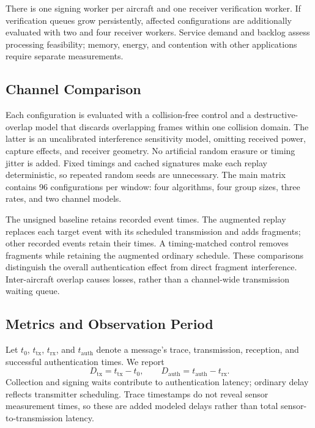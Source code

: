 There is one signing worker per aircraft and one receiver verification
worker. If verification queues grow persistently, affected configurations
are additionally evaluated with two and four receiver workers. Service
demand and backlog assess processing feasibility; memory, energy, and
contention with other applications require separate measurements.

\subsection{Channel Comparison}
\label{subsec:experimental-variables}

Each configuration is evaluated with a collision-free control and a
destructive-overlap model that discards overlapping frames within one
collision domain. The latter is an uncalibrated interference sensitivity
model, omitting received power, capture effects, and receiver geometry.
No artificial random erasure or timing jitter is added. Fixed timings and
cached signatures make each replay deterministic, so repeated random seeds
are unnecessary. The main matrix contains 96 configurations per window:
four algorithms, four group sizes, three rates, and two channel models.

The unsigned baseline retains recorded event times. The augmented replay
replaces each target event with its scheduled transmission and adds
fragments; other recorded events retain their times. A timing-matched
control removes fragments while retaining the augmented ordinary schedule.
These comparisons distinguish the overall authentication effect from
direct fragment interference. Inter-aircraft overlap causes losses, rather
than a channel-wide transmission waiting queue.

\subsection{Metrics and Observation Period}
\label{subsec:evaluation-metrics}

Let $t_0$, $t_{\mathrm{tx}}$, $t_{\mathrm{rx}}$, and $t_{\mathrm{auth}}$
denote a message's trace, transmission, reception, and successful
authentication times. We report
\[
 D_{\mathrm{tx}}=t_{\mathrm{tx}}-t_0,
 \qquad D_{\mathrm{auth}}=t_{\mathrm{auth}}-t_{\mathrm{rx}}.
\]
Collection and signing waits contribute to authentication latency; ordinary
delay reflects transmitter scheduling. Trace timestamps do not reveal
sensor measurement times, so these are added modeled delays rather than
total sensor-to-transmission latency.

